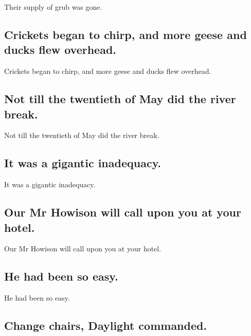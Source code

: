 \documentclass[]{article}
\begin{document}
Their supply of grub was gone.

\hypertarget{crickets-began-to-chirp-and-more-geese-and-ducks-flew-overhead.}{%
\subsection{Crickets began to chirp, and more geese and ducks flew
overhead.}\label{crickets-began-to-chirp-and-more-geese-and-ducks-flew-overhead.}}

Crickets began to chirp, and more geese and ducks flew overhead.

\hypertarget{not-till-the-twentieth-of-may-did-the-river-break.}{%
\subsection{Not till the twentieth of May did the river
break.}\label{not-till-the-twentieth-of-may-did-the-river-break.}}

Not till the twentieth of May did the river break.

\hypertarget{it-was-a-gigantic-inadequacy.}{%
\subsection{It was a gigantic
inadequacy.}\label{it-was-a-gigantic-inadequacy.}}

It was a gigantic inadequacy.

\hypertarget{our-mr-howison-will-call-upon-you-at-your-hotel.}{%
\subsection{Our Mr Howison will call upon you at your
hotel.}\label{our-mr-howison-will-call-upon-you-at-your-hotel.}}

Our Mr Howison will call upon you at your hotel.

\hypertarget{he-had-been-so-easy.}{%
\subsection{He had been so easy.}\label{he-had-been-so-easy.}}

He had been so easy.

\hypertarget{change-chairs-daylight-commanded.}{%
\subsection{Change chairs, Daylight
commanded.}\label{change-chairs-daylight-commanded.}}
\end{document}

